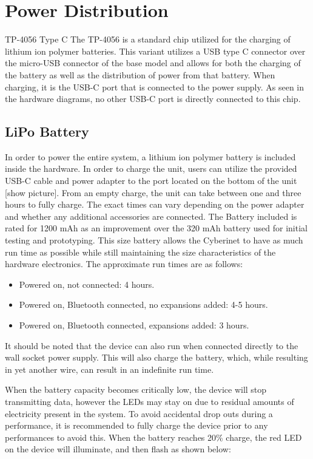 \section{Power Distribution}
TP-4056 Type C
The TP-4056 is a standard chip utilized for the charging of lithium ion polymer batteries. This variant utilizes a USB type C connector over the micro-USB connector of the base model and allows for both the charging of the battery as well as the distribution of power from that battery. When charging, it is the USB-C port that is connected to the power supply. As seen in the hardware diagrams, no other USB-C port is directly connected to this chip.

\subsection{LiPo Battery}
In order to power the entire system, a lithium ion polymer battery is included inside the hardware. In order to charge the unit, users can utilize the provided USB-C cable and power adapter to the port located on the bottom of the unit [show picture]. From an empty charge, the unit can take between one and three hours to fully charge. The exact times can vary depending on the power adapter and whether any additional accessories are connected. 
The Battery included is rated for 1200 mAh as an improvement over the 320 mAh battery used for initial testing and prototyping. This size battery allows the Cyberinet to have as much run time as possible while still maintaining the size characteristics of the hardware electronics. The approximate run times are as follows:

\begin{itemize}
    \item Powered on, not connected: 4 hours.
    \item Powered on, Bluetooth connected, no expansions added: 4-5 hours.
    \item Powered on, Bluetooth connected, expansions added: 3 hours.
\end{itemize}


It should be noted that the device can also run when connected directly to the wall socket power supply. This will also charge the battery, which, while resulting in yet another wire, can result in an indefinite run time.

When the battery capacity becomes critically low, the device will stop transmitting data, however the LEDs may stay on due to residual amounts of electricity present in the system. To avoid accidental drop outs during a performance, it is recommended to fully charge the device prior to any performances to avoid this. When the battery reaches 20\% charge, the red LED on the device will illuminate, and then flash as shown below:

